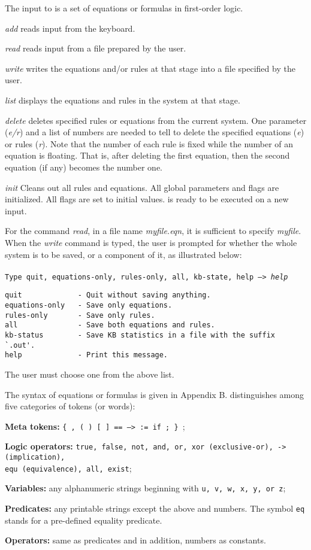 The input to \RRL is a set of equations or formulas in first-order logic.
\begin{description} 
   \item{\em add} reads input from the keyboard.
   \item{\em read} reads input from a file prepared by the user. 
   \item{\em write} writes the equations and/or rules
at that stage into a file specified by the
user. 
   \item{\em list} displays the equations and rules in the
system at that stage.
   \item {\em delete} deletes specified rules or equations from the current
system. One parameter ({\em e/r}) and a list of numbers are needed to tell
\RRL to delete the specified equations ({\em e}) or rules ({\em r}).
Note that the number of each rule is fixed while the number of an equation
is floating. That is, after deleting the first equation, then the second
equation (if any) becomes the number one.
   \item {\em init} Cleans out all rules and equations. All global parameters
and flags are
initialized. All flags are set to initial values.  \RRL is ready to be
executed on a new input.
\end{description}

For the command {\em read}, in a file name {\em myfile.eqn}, 
it is sufficient to specify {\em myfile}. 
When the {\em write} command is typed, 
the user is prompted for whether the whole
system is to be saved, or a component of it, as illustrated below: 
\\ \\
{\tt Type quit, equations-only, rules-only, all, kb-state, help --> {\em help}}
\begin{verbatim}
quit             - Quit without saving anything.
equations-only   - Save only equations.
rules-only       - Save only rules.
all              - Save both equations and rules.
kb-status        - Save KB statistics in a file with the suffix `.out'.
help             - Print this message.  
\end{verbatim}
The user must choose one from the above list.
  
The syntax of equations or formulas is given in Appendix B.
\RRL distinguishes among five categories of tokens (or words):
\begin{description}
 \item{\bf Meta tokens:}  {\tt \{ ,  (  )  [ ]  ==  ---> := if ; \} };
 \item{\bf Logic operators:} {\tt true, false, not, and, or, xor 
\rm (exclusive-or), \tt -> \rm (implication), \\
\tt equ \rm (equivalence), \tt all, exist\rm };
 \item{\bf Variables:}  any alphanumeric strings 
beginning with {\tt u, v, w, x, y, {\rm or} z};
 \item{\bf Predicates:} any printable strings except the above and numbers.
The symbol {\tt eq} stands for a pre-defined
equality predicate.
 \item{\bf Operators:} same as predicates and in addition, numbers as constants.
\end{description}
  
